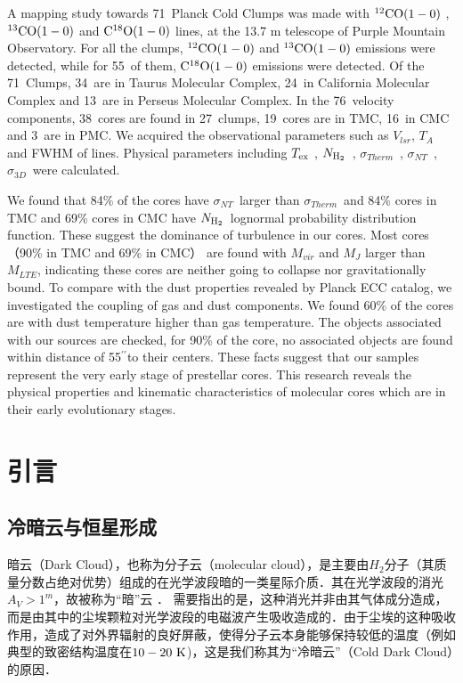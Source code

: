 \documentclass[UTF8, nocolorlinks]{pkuthss}
\newcommand{\coaa}{$\rm^{12}CO(1-0)$ }
\newcommand{\cobb}{$\rm^{13}CO(1-0)$ }
\newcommand{\cocc}{$\rm C^{18}O(1-0)$ }
\newcommand{\texc}{$T_{\rm {ex}}$ }
\newcommand{\nhyd}{$N_{\rm H_2}$\ }
\newcommand{\sigmath}{$\sigma _{Therm}$\ }
\newcommand{\sigmant}{$\sigma _{NT}$\ }
\newcommand{\sigmatd}{$\sigma _{3D}$\ }
\newcommand{\arcsec}{$^{\prime\prime}$}
\newcommand{\numsou}{71\ }
\newcommand{\numsoutmc}{34\ }
\newcommand{\numsoupmc}{13\ }
\newcommand{\numsoucmc}{24\ }
\newcommand{\numcore}{38\ }
\newcommand{\numcoretmc}{19\ }
\newcommand{\numcorepmc}{3\ }
\newcommand{\numcorecmc}{16\ }
\newcommand{\numcocc}{55\ }
\newcommand{\numcompofcores}{27\ }
\newcommand{\numvelcomp}{76\ }
\begin{document}
\begin{eabstract}

	A mapping study towards \numsou Planck Cold Clumps was made with \coaa, \cobb and \cocc lines, at the 13.7 m telescope of Purple Mountain Observatory. For all the clumps, \coaa and \cobb emissions were detected, while for \numcocc of them, \cocc emissions were detected.  Of the \numsou Clumps, \numsoutmc are in Taurus Molecular Complex, \numsoucmc in California  Molecular Complex and \numsoupmc are in Perseus Molecular Complex. In the \numvelcomp velocity components, \numcore cores are found in \numcompofcores clumps, \numcoretmc cores are in TMC, \numcorecmc in CMC and \numcorepmc are in PMC.
    We acquired the observational parameters such as $V_{lsr}$, $T_{A}$ and FWHM of lines. Physical parameters including \texc, \nhyd, \sigmath, \sigmant,  \sigmatd were calculated.

    We found that 84\% of the cores have \sigmant larger than \sigmath and 84\% cores in TMC and 69\% cores in CMC have \nhyd lognormal probability distribution function. These suggest the dominance of turbulence in our cores. Most cores （90\% in TMC and 69\% in CMC） are found with $M_{vir}$ and $M_J$ larger than $M_{LTE}$, indicating these cores are neither going to collapse nor gravitationally bound. To compare with the dust properties revealed by Planck ECC catalog, we investigated the coupling of gas and dust components. We found 60\% of the cores are with dust temperature higher than gas temperature. The objects associated with our sources are checked, for 90\% of the core, no associated objects are found within distance of 55\arcsec to their centers. These facts suggest that our samples represent the very early stage of prestellar cores. This research reveals the physical properties and kinematic characteristics of molecular cores which are in their early evolutionary stages.
\end{eabstract}

	\tableofcontents
	\mainmatter

\chapter{引言}

	\section{冷暗云与恒星形成}\label{Sec.ColdDarkCloud}

		暗云（Dark Cloud），也称为分子云（molecular cloud），是主要由$H_2$分子（其质量分数占绝对优势）组成的在光学波段暗的一类星际介质．其在光学波段的消光$A_V>1^{m}$，故被称为“暗”云\supercite{2007ARA&A..45..339B} ． 需要指出的是，这种消光并非由其气体成分造成，而是由其中的尘埃颗粒对光学波段的电磁波产生吸收造成的．由于尘埃的这种吸收作用，造成了对外界辐射的良好屏蔽，使得分子云本身能够保持较低的温度（例如典型的致密结构温度在$10-20\rm\ K$\supercite{1983ApJ...265..223B})，这是我们称其为“冷暗云”（Cold Dark Cloud）的原因．
\end{document}
